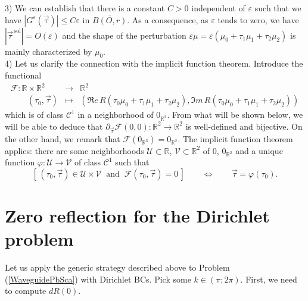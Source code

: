 \documentclass[11pt,a4paper]{report}
\newcommand{\eps}{\varepsilon}
\newcommand{\mrm}[1]{\mathrm{#1}}
\newcommand{\R}{\mathbb{R}}
\begin{document}
3) We can establish that there is a constant $C>0$ independent of $\eps$ such that we have $|G^\eps(\vec{\tau})| \le C\eps$ in $\overline{B(O,r)}$. As a consequence, as $\eps$ tends to zero, we have $|\vec{\tau}^{\,\mrm{sol}}|=O(\eps)$ and the shape of the perturbation $\eps\mu=\eps(\mu_0+\tau_1\mu_1+\tau_2\mu_2)$ is mainly characterized by $\mu_0$.\\[4pt]
4) Let us clarify the connection with the implicit function theorem. Introduce the functional
\[
\begin{array}{ccc}
\mathscr{F}  :  \R\times\R^2  & \to & \R^2 \\
\qquad (\tau_0,\vec{\tau}) & \mapsto & (\Re e\,R(\tau_0\mu_0+\tau_1\mu_1+\tau_2\mu_2),\Im m\,R(\tau_0\mu_0+\tau_1\mu_1+\tau_2\mu_2))
\end{array}
\]
which is of class $\mathscr{C}^1$ in a neighborhood of $0_{\R^3}$. From what will be shown below, we will be able to deduce that $\partial_{\vec{\tau}}\mathscr{F}(0,0): \R^2 \to \R^2$ is well-defined and bijective. On the other hand, we remark that $\mathscr{F}(0_{\R^3})=0_{\R^2}$. The implicit function theorem applies: there are some neighborhoods $\mathscr{U} \subset \R$, $\mathscr{V} \subset  \R^2 $ of $0$, $0_{\R^2}$ and a unique function $\varphi : \mathscr{U} \to \mathscr{V}$ of class $\mathscr{C}^1$ such that 
\[
[\,(\tau_0,\vec{\tau})\in \mathscr{U} \times \mathscr{V}\ \mbox{ and }\ \mathscr{F}(\tau_0,\vec{\tau})=0\,] \qquad\Leftrightarrow\qquad \vec{\tau} = \varphi (\tau_0).
\]



\section{Zero reflection for the Dirichlet problem}

Let us apply the generic strategy described above to Problem (\ref{WaveguidePbSca}) with Dirichlet BCs. Pick some $k\in(\pi;2\pi)$. First, we need to compute $dR(0)$. 
\end{document}
